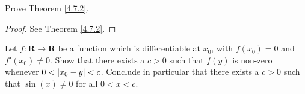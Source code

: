 \exercisesection

\begin{exercise}\label{ex 4.7.1}
    Prove Theorem \ref{4.7.2}.
\end{exercise}

\begin{proof}
    See Theorem \ref{4.7.2}.
\end{proof}

\begin{exercise}\label{ex 4.7.2}
    Let \(f : \mathbf{R} \to \mathbf{R}\) be a function which is differentiable at \(x_0\), with \(f(x_0) = 0\) and \(f'(x_0) \neq 0\).
    Show that there exists a \(c > 0\) such that \(f(y)\) is non-zero whenever \(0 < \abs*{x_0 - y} < c\).
    Conclude in particular that there exists a \(c > 0\) such that \(\sin(x) \neq 0\) for all \(0 < x < c\).
\end{exercise}


